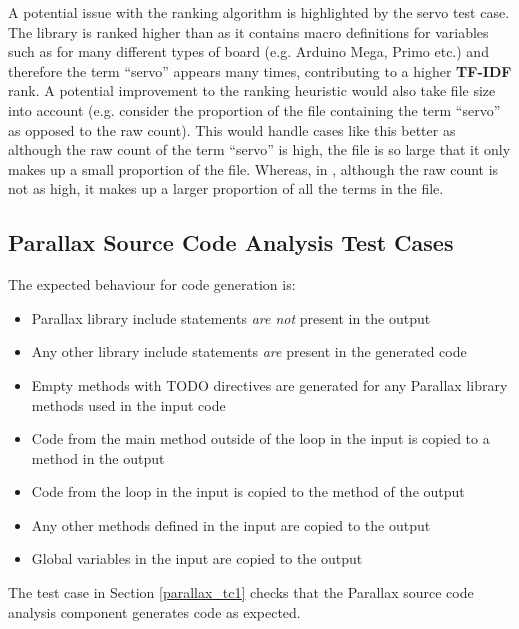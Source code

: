 \documentclass{UoYCSproject}
\begin{document}
A potential issue with the ranking algorithm is highlighted by the servo test case. The  library is ranked higher than  as it contains macro definitions for variables such as  for many different types of board (e.g. Arduino Mega, Primo etc.) and therefore the term ``servo'' appears many times, contributing to a higher \textbf{TF-IDF} rank. A potential improvement to the ranking heuristic would also take file size into account (e.g. consider the proportion of the file containing the term ``servo'' as opposed to the raw count). This would handle cases like this better as although the raw count of the term ``servo'' is high, the file is so large that it only makes up a small proportion of the file. Whereas, in , although the raw count is not as high, it makes up a larger proportion of all the terms in the file.

\subsection{Parallax Source Code Analysis Test Cases} \label{pscatc}
The expected behaviour for code generation is:
\begin{itemize}
\item Parallax library include statements \textit{are not} present in the output
\item Any other library include statements \textit{are} present in the generated code
\item Empty methods with TODO directives are generated for any Parallax library methods used in the input code
\item Code from the main method outside of the  loop in the input is copied to a  method in the output
\item Code from the  loop in the input is copied to the  method of the output
\item Any other methods defined in the input are copied to the output
\item Global variables in the input are copied to the output
\end{itemize}
The test case in Section \ref{parallax_tc1} checks that the Parallax source code analysis component generates code as expected.
\end{document}
